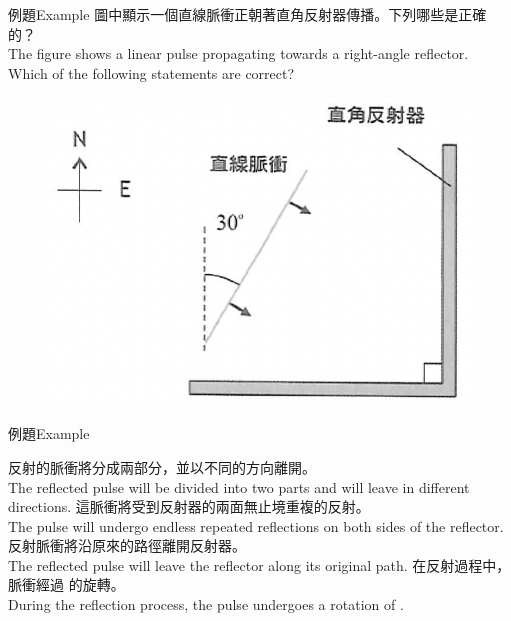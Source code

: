 \documentclass[beamer=true]{standalone}
\begin{document}
\begin{frame}[t]{例題Example}
    圖中顯示一個直線脈衝正朝著直角反射器傳播。下列哪些是正確的？\\The figure shows a linear pulse propagating towards a right-angle reflector. Which of the following statements are correct?

    \begin{figure}
        \centering
        \includegraphics[width=0.6\linewidth]{images/Screenshot 2023-09-27 at 5.37.55 PM.png}
    \end{figure}

\end{frame}

\begin{frame}[t]{例題Example}
    \begin{tasks}
        \task 反射的脈衝將分成兩部分，並以不同的方向離開。\\The reflected pulse will be divided into two parts and will leave in different directions.
        \task 這脈衝將受到反射器的兩面無止境重複的反射。\\The pulse will undergo endless repeated reflections on both sides of the reflector.
        \task 反射脈衝將沿原來的路徑離開反射器。\\The reflected pulse will leave the reflector along its original path.
        \task 在反射過程中，脈衝經過 的旋轉。\\During the reflection process, the pulse undergoes a rotation of .
    \end{tasks}
\end{frame}
\end{document}
